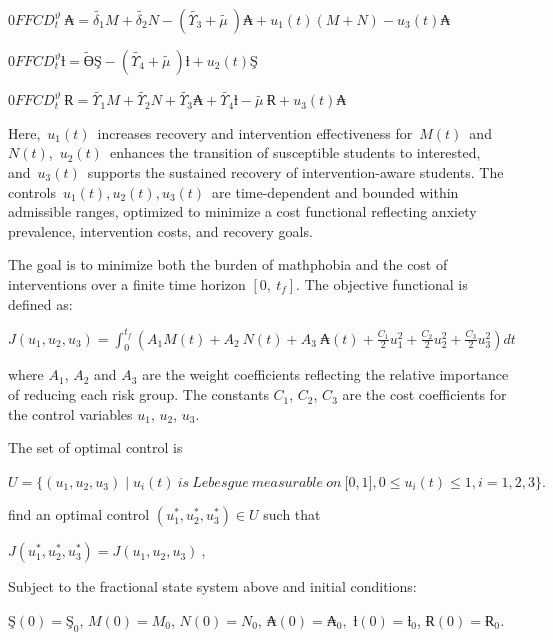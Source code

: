 \documentclass[
]{article}
\begin{document}
\(0FFCD_{t}^{\vartheta}\ ₳ = \widetilde{\delta_{1}}M + \widetilde{\delta_{2}}N - \left( \widetilde{\Upsilon_{3}} + \widetilde{\mu\ } \right)₳ + u_{1}(t)(M + N) - u_{3}(t)₳\)

\(0FFCD_{t}^{\vartheta}ƚ = \widetilde{Ө}Ş - \left( \widetilde{\Upsilon_{4}} + \widetilde{\mu\ } \right)ƚ + u_{2}(t)Ş\)

\(0FFCD_{t}^{\vartheta}\ Ɍ = \widetilde{\Upsilon_{1}}M + \widetilde{\Upsilon_{2}}N + \widetilde{\Upsilon_{3}}₳ + \widetilde{\Upsilon_{4}}ƚ - \widetilde{\mu\ }Ɍ + u_{3}(t)₳\)

Here,~\(u_{1}(t)\)~increases recovery and intervention effectiveness for~\(M(t)\)~and~\(N(t)\),~\(u_{2}(t)\)~enhances the transition of susceptible students to interested, and~\(u_{3}(t)\)~supports the sustained recovery of intervention-aware students. The controls~\(u_{1}(t),u_{2}(t),u_{3}(t)\)~are time-dependent and bounded within admissible ranges, optimized to minimize a cost functional reflecting anxiety prevalence, intervention costs, and recovery goals.

The goal is to minimize both the burden of mathphobia and the cost of interventions over a finite time horizon \(\left\lbrack 0,\ t_{f} \right\rbrack.\) The objective functional is defined as:

\(J\left( u_{1},u_{2},u_{3} \right) = \int_{0}^{t_{f}}{}\left( A_{1}M(t) + A_{2}\ N(t) + A_{3}\ ₳(t) + \frac{C_{1}}{2}u_{1}^{2} + \frac{C_{2}}{2}u_{2}^{2} + \frac{C_{3}}{2}u_{3}^{2} \right)dt\)

where \(A_{1}\), \(A_{2}\) and \(A_{3}\) are the weight coefficients reflecting the relative importance of reducing each risk group. The constants \(C_{1}\), \(C_{2}\), \(C_{3}\) are the cost coefficients for the control variables \(u_{1}\), \(u_{2}\), \(u_{3}\).

The set of optimal control is

\(U = \{\left( u_{1},u_{2},u_{3} \right) \mid u_{i}(t)\ is\ Lebesgue\ measurable\ on\ \lbrack 0,1\rbrack,0 \leq u_{i}(t) \leq 1,i = 1,2,3\}.\)

find an optimal control \((u_{1}^{*},u_{2}^{*},u_{3}^{*}) \in U\) such that

\(J\left( u_{1}^{*},u_{2}^{*},u_{3}^{*} \right) = J\left( u_{1},u_{2},u_{3} \right)\ ,\)

Subject to the fractional state system above and initial conditions:

\(Ş(0) = Ş_{0}\), \(M(0) = M_{0}\), \(N(0) = N_{0}\), \(₳(0) = ₳_{0},\) \(ƚ(0) = ƚ_{0}\), \(Ɍ(0) = Ɍ_{0}\)\emph{.}
\end{document}
